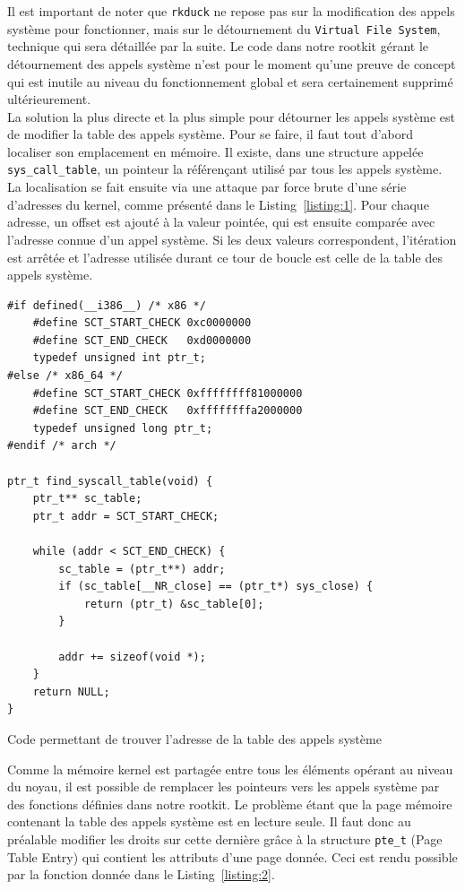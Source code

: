 \documentclass[12pt]{article}
\begin{document}
        Il est important de noter que \texttt{rkduck} ne repose pas sur la modification des appels système pour fonctionner, mais sur le détournement du \texttt{Virtual File System}, technique qui sera détaillée par la suite. Le code dans notre rootkit gérant le détournement des appels système n'est pour le moment qu'une preuve de concept qui est inutile au niveau du fonctionnement global et sera certainement supprimé ultérieurement. \\

        La solution la plus directe et la plus simple pour détourner les appels système est de modifier la table des appels système\cite{turbochaos}. Pour se faire, il faut tout d'abord localiser son emplacement en mémoire. Il existe, dans une structure appelée \texttt{sys\_call\_table}, un pointeur la référençant utilisé par tous les appels système. La localisation  se fait ensuite via une attaque par force brute d'une série d'adresses du kernel, comme présenté dans le Listing~\ref{listing:1}. Pour chaque adresse, un offset est ajouté à la valeur pointée, qui est ensuite comparée avec l'adresse connue d'un appel système. Si les deux valeurs correspondent, l'itération est arrêtée et l'adresse utilisée durant ce tour de boucle est celle de la table des appels système.

\begin{listing}[H]
\begin{verbatim}
#if defined(__i386__) /* x86 */
    #define SCT_START_CHECK 0xc0000000
    #define SCT_END_CHECK   0xd0000000
    typedef unsigned int ptr_t;
#else /* x86_64 */
    #define SCT_START_CHECK 0xffffffff81000000
    #define SCT_END_CHECK   0xffffffffa2000000
    typedef unsigned long ptr_t;
#endif /* arch */

ptr_t find_syscall_table(void) {
    ptr_t** sc_table;
    ptr_t addr = SCT_START_CHECK;
    
    while (addr < SCT_END_CHECK) {
        sc_table = (ptr_t**) addr;
        if (sc_table[__NR_close] == (ptr_t*) sys_close) {
            return (ptr_t) &sc_table[0];
        }

        addr += sizeof(void *);
    }
    return NULL;
}
\end{verbatim}
\caption{Code permettant de trouver l'adresse de la table des appels système\cite{turbochaos}}
\label{listing:1}
\end{listing}
        
        Comme la mémoire kernel est partagée entre tous les éléments opérant au niveau du noyau, il est possible de remplacer les pointeurs vers les appels système par des fonctions définies dans notre rootkit. Le problème étant que la page mémoire contenant la table des appels système est en lecture seule. Il faut donc au préalable modifier les droits sur cette dernière grâce à la structure \texttt{pte\_t} (Page Table Entry) qui contient les attributs d'une page donnée. Ceci est rendu possible par la fonction donnée dans le Listing~\ref{listing:2}.
        
\end{document}
